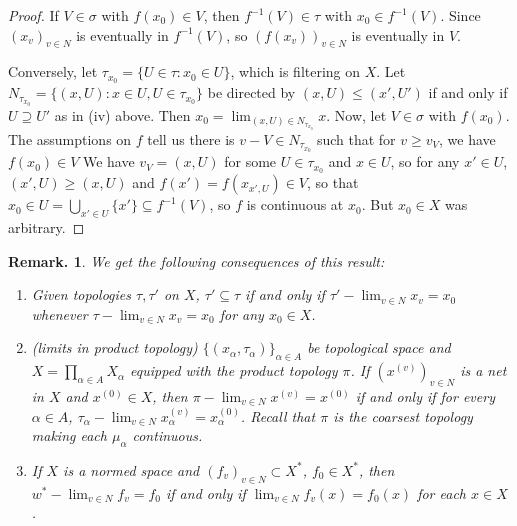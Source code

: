 \documentclass[11pt, a4paper]{memoir}
\theoremstyle{change}
\theoremstyle{plain}
\theoremstyle{nonumberplain}
\newtheorem{remark}{Remark.}
\newtheorem{proof}{Proof}
\numberwithin{equation}{section}
\begin{document}
\begin{proof}
    If $V\in\sigma$ with $f(x_0)\in V$, then $f^{-1}(V)\in\tau$ with $x_0\in f^{-1}(V)$.
    Since $(x_v)_{v\in N}$ is eventually in $f^{-1}(V)$, so $(f(x_v))_{v\in N}$ is eventually in $V$.

    Conversely, let $\tau_{x_0}=\{U\in\tau:x_0\in U\}$, which is filtering on $X$.
    Let $N_{\tau_{x_0}}=\{(x,U):x\in U,U\in\tau_{x_0}\}$ be directed by $(x,U)\leq(x',U')$ if and only if $U\supseteq U'$ as in (iv) above.
    Then $x_0=\lim_{(x,U)\in N_{\tau_{x_0}}}x$.
    Now, let $V\in\sigma$ with $f(x_0)$.
    The assumptions on $f$ tell us there is $v-V\in N_{\tau_{x_0}}$ such that for $v\geq v_V$, we have $f(x_0)\in V$
    We have $v_V=(x,U)$ for some $U\in\tau_{x_0}$ and $x\in U$, so for any $x'\in U$, $(x',U)\geq(x,U)$ and $f(x')=f(x_{x',U})\in V$, so that $x_0\in U=\bigcup_{x'\in U}\{x'\}\subseteq f^{-1}(V)$, so $f$ is continuous at $x_0$.
    But $x_0\in X$ was arbitrary.
\end{proof}
\begin{remark}
    We get the following consequences of this result:
    \begin{enumerate}[nl,r]
        \item Given topologies $\tau,\tau'$ on $X$, $\tau'\subseteq\tau$ if and only if $\tau'-\lim_{v\in N}x_v=x_0$ whenever $\tau-\lim_{v\in N}x_v=x_0$ for any $x_0\in X$.
        \item (limits in product topology) $\{(x_\alpha,\tau_\alpha)\}_{\alpha\in A}$ be topological space and $X=\prod_{\alpha\in A}X_\alpha$ equipped with the product topology $\pi$.
            If $(x^{(v)})_{v\in N}$ is a net in $X$ and $x^{(0)}\in X$, then $\pi-\lim_{v\in N}x^{(v)}=x^{(0)}$ if and only if for every $\alpha\in A$, $\tau_\alpha-\lim_{v\in N}x_\alpha^{(v)}=x_\alpha^{(0)}$.
            Recall that $\pi$ is the coarsest topology making each $\mu_\alpha$ continuous.
        \item If $X$ is a normed space and $(f_v)_{v\in N}\subset X^*$, $f_0\in X^*$, then $w^*-\lim_{v\in N}f_v=f_0$ if and only if $\lim_{v\in N}f_v(x)=f_0(x)$ for each $x\in X$.
    \end{enumerate}
\end{remark}
\end{document}
